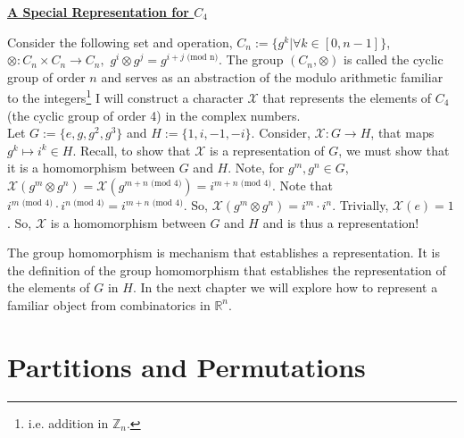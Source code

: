 \documentclass[11pt]{book}
\begin{document}
\begin{examp}
	\begin{center}
		\underline{\textbf{A Special Representation for $C_4$}}\\
	\end{center}
	Consider the following set and operation, $C_n := \{g^k | \forall k \in [0,n-1]\}$, $\otimes:C_n \times C_n \to C_n,$ $g^i \otimes g^j = g^{i+j \text{ (mod n)}}$. The group 
	$(C_n, \otimes)$ is called the cyclic group of order $n$ and serves as an abstraction of the modulo arithmetic familiar to the integers\footnote{i.e. addition in $\mathbb{Z}_n.$}
	I will construct a character $\mathcal{X}$ that represents the elements of $C_4$ (the cyclic group of order 4) in the complex numbers.\\

	Let $G := \{e, g, g^2, g^3\}$ and $H := \{1, i, -1, -i\}$. Consider, $\mathcal{X}: G \to H$, that maps $g^k \mapsto i^k \in H$. Recall, to show that $\mathcal{X}$ is a representation of $G$, 
	we must show that it is a homomorphism between $G$ and $H$. Note, for $g^m, g^n \in G$, $\mathcal{X}(g^m \otimes g^n) = \mathcal{X}(g^{m+n \text{ (mod 4)}}) = i^{m+n \text{ (mod 4)}}$. Note that 
	$i^{m \text{ (mod 4)}} \cdot i^{n \text{ (mod 4)}} = i^{m+n \text{ (mod 4)}}$. So, $\mathcal{X}(g^m \otimes g^n) = i^m \cdot i^n$. Trivially, $\mathcal{X}(e) = 1$. So, $\mathcal{X}$ is a 
	homomorphism between $G$ and $H$ and is thus a representation!

\end{examp}

The group homomorphism is mechanism that establishes a representation. It is the definition of the group homomorphism that establishes the representation of the elements of $G$ in $H$. In the 
next chapter we will explore how to represent a familiar object from combinatorics in $\mathbb{R}^n$.

\newpage

\section{Partitions and Permutations}
\end{document}

